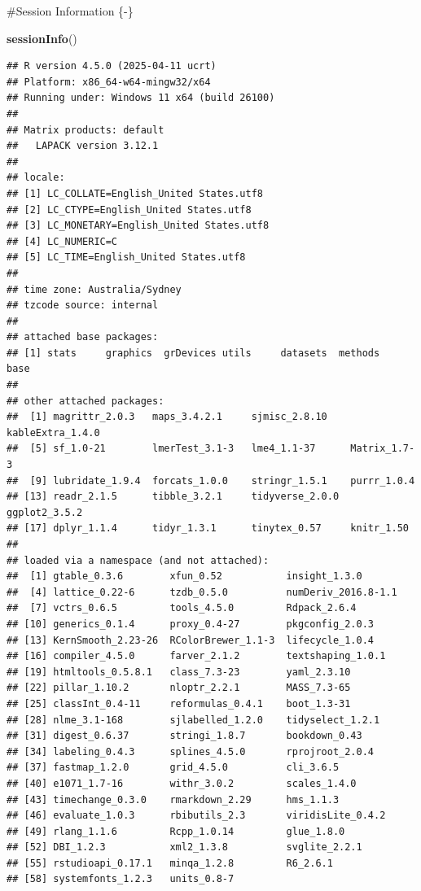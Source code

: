 \documentclass[
]{article}
\newenvironment{Shaded}{\begin{snugshade}}{\end{snugshade}}
\newcommand{\FunctionTok}[1]{\textcolor[rgb]{0.13,0.29,0.53}{\textbf{#1}}}
\newcommand{\NormalTok}[1]{#1}
\begin{document}
\newpage

\#Session Information \{-\}

\begin{Shaded}
\begin{Highlighting}[]
\FunctionTok{sessionInfo}\NormalTok{()}
\end{Highlighting}
\end{Shaded}

\begin{verbatim}
## R version 4.5.0 (2025-04-11 ucrt)
## Platform: x86_64-w64-mingw32/x64
## Running under: Windows 11 x64 (build 26100)
## 
## Matrix products: default
##   LAPACK version 3.12.1
## 
## locale:
## [1] LC_COLLATE=English_United States.utf8 
## [2] LC_CTYPE=English_United States.utf8   
## [3] LC_MONETARY=English_United States.utf8
## [4] LC_NUMERIC=C                          
## [5] LC_TIME=English_United States.utf8    
## 
## time zone: Australia/Sydney
## tzcode source: internal
## 
## attached base packages:
## [1] stats     graphics  grDevices utils     datasets  methods   base     
## 
## other attached packages:
##  [1] magrittr_2.0.3   maps_3.4.2.1     sjmisc_2.8.10    kableExtra_1.4.0
##  [5] sf_1.0-21        lmerTest_3.1-3   lme4_1.1-37      Matrix_1.7-3    
##  [9] lubridate_1.9.4  forcats_1.0.0    stringr_1.5.1    purrr_1.0.4     
## [13] readr_2.1.5      tibble_3.2.1     tidyverse_2.0.0  ggplot2_3.5.2   
## [17] dplyr_1.1.4      tidyr_1.3.1      tinytex_0.57     knitr_1.50      
## 
## loaded via a namespace (and not attached):
##  [1] gtable_0.3.6        xfun_0.52           insight_1.3.0      
##  [4] lattice_0.22-6      tzdb_0.5.0          numDeriv_2016.8-1.1
##  [7] vctrs_0.6.5         tools_4.5.0         Rdpack_2.6.4       
## [10] generics_0.1.4      proxy_0.4-27        pkgconfig_2.0.3    
## [13] KernSmooth_2.23-26  RColorBrewer_1.1-3  lifecycle_1.0.4    
## [16] compiler_4.5.0      farver_2.1.2        textshaping_1.0.1  
## [19] htmltools_0.5.8.1   class_7.3-23        yaml_2.3.10        
## [22] pillar_1.10.2       nloptr_2.2.1        MASS_7.3-65        
## [25] classInt_0.4-11     reformulas_0.4.1    boot_1.3-31        
## [28] nlme_3.1-168        sjlabelled_1.2.0    tidyselect_1.2.1   
## [31] digest_0.6.37       stringi_1.8.7       bookdown_0.43      
## [34] labeling_0.4.3      splines_4.5.0       rprojroot_2.0.4    
## [37] fastmap_1.2.0       grid_4.5.0          cli_3.6.5          
## [40] e1071_1.7-16        withr_3.0.2         scales_1.4.0       
## [43] timechange_0.3.0    rmarkdown_2.29      hms_1.1.3          
## [46] evaluate_1.0.3      rbibutils_2.3       viridisLite_0.4.2  
## [49] rlang_1.1.6         Rcpp_1.0.14         glue_1.8.0         
## [52] DBI_1.2.3           xml2_1.3.8          svglite_2.2.1      
## [55] rstudioapi_0.17.1   minqa_1.2.8         R6_2.6.1           
## [58] systemfonts_1.2.3   units_0.8-7
\end{verbatim}
\end{document}
